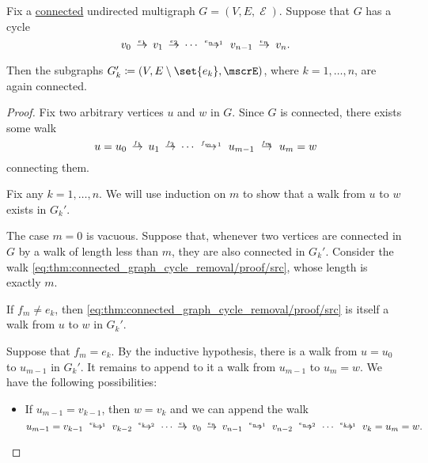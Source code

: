 \begin{proposition}\label{thm:connected_graph_cycle_removal}
  Fix a \hyperref[def:graph_connectedness/undirected]{connected} undirected multigraph \( G = (V, E, \mscrE) \). Suppose that \( G \) has a cycle
  \begin{equation*}
    v_0 \reloset {e_1} \to v_1 \reloset {e_2} \to \cdots \reloset {e_{n-1}} \to v_{n-1} \reloset {e_n} \to v_n.
  \end{equation*}

  Then the subgraphs \( G_k' \coloneqq (V, E \setminus \set{ e_k }, \mscrE) \), where \( k = 1, \ldots, n \), are again connected.
\end{proposition}
\begin{proof}
  Fix two arbitrary vertices \( u \) and \( w \) in \( G \). Since \( G \) is connected, there exists some walk
  \begin{equation}\label{eq:thm:connected_graph_cycle_removal/proof/src}
    u = u_0 \reloset {f_1} \to u_1 \reloset {f_2} \to \cdots \reloset {f_{m-1}} \to u_{m-1} \reloset {f_m} \to u_m = w
  \end{equation}
  connecting them.

  Fix any \( k = 1, \ldots, n \). We will use induction on \( m \) to show that a walk from \( u \) to \( w \) exists in \( G_k' \).

  The case \( m = 0 \) is vacuous. Suppose that, whenever two vertices are connected in \( G \) by a walk of length less than \( m \), they are also connected in \( G_k' \). Consider the walk \eqref{eq:thm:connected_graph_cycle_removal/proof/src}, whose length is exactly \( m \).

  If \( f_m \neq e_k \), then \eqref{eq:thm:connected_graph_cycle_removal/proof/src} is itself a walk from \( u \) to \( w \) in \( G_k' \).

  Suppose that \( f_m = e_k \). By the inductive hypothesis, there is a walk from \( u = u_0 \) to \( u_{m-1} \) in \( G_k' \). It remains to append to it a walk from \( u_{m-1} \) to \( u_m = w \). We have the following possibilities:
  \begin{itemize}
    \item If \( u_{m-1} = v_{k-1} \), then \( w = v_k \) and we can append the walk
    \begin{equation*}
      u_{m-1} = v_{k-1} \reloset {e_{k-1}} \to v_{k-2} \reloset {e_{k-2}} \to \cdots \reloset {e_1} \to v_0 \reloset {e_n} \to v_{n-1} \reloset {e_{n-1}} \to v_{n-2} \reloset {e_{n-2}} \to \cdots \reloset {e_{k+1}} \to v_k = u_m = w.
    \end{equation*}


\end{itemize}
\end{proof}
